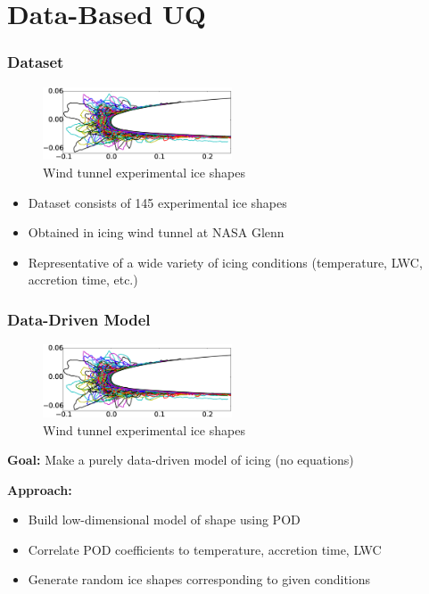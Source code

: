 \documentclass[9pt]{beamer}
\begin{document}
\section{Data-Based UQ}
\label{sec-3}
\begin{frame}
\frametitle{Dataset}
\label{sec-3-1}

\vspace*{-0.0cm}\begin{figure}
      \includegraphics[width=0.5\textwidth]{GlobalDataSet}
      \caption{Wind tunnel experimental ice shapes}
\end{figure}
\begin{itemize}
\item Dataset consists of 145 experimental ice shapes
\item Obtained in icing wind tunnel at NASA Glenn\footnotemark[1]
\item Representative of a wide variety of icing conditions (temperature,
  LWC, accretion time, etc.)
\end{itemize}
  
\end{frame}
\begin{frame}
\frametitle{Data-Driven Model}
\label{sec-3-2}

\vspace*{-0.0cm}\begin{figure}
      \includegraphics[width=0.5\textwidth]{GlobalDataSet}
      \caption{Wind tunnel experimental ice shapes}
\end{figure}
\textbf{Goal:} Make a purely data-driven model of icing (no equations)

\textbf{Approach:}
\begin{itemize}
\item Build low-dimensional model of shape using POD
\item Correlate POD coefficients to temperature, accretion time, LWC
\item Generate random ice shapes corresponding to given conditions
\end{itemize}
\end{frame}
\end{document}
